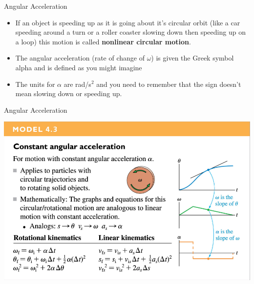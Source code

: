 \documentclass{beamer}
\begin{document}
\begin{frame}{Angular Acceleration}
\begin{itemize}
   \item If an object is speeding up as it is going about it's circular orbit (like a car speeding around a turn or a roller coaster slowing down then speeding up on a loop) this motion is called {\bf nonlinear circular motion}.
   \item<2-> The angular acceleration (rate of change of $\omega$) is given the Greek symbol alpha and is defined as you might imagine
\end{itemize}
\begin{itemize}
   \item<3-> The units for $\alpha$ are rad/s$^2$ and you need to remember that the sign doesn't mean slowing down or speeding up.
\end{itemize}
\begin{center}
\end{center}
\end{frame}

\begin{frame}{Angular Acceleration}
\begin{center}
   \includegraphics[width=\textwidth]{../figures/model4_3.png}
\end{center}
\end{frame}
\end{document}
